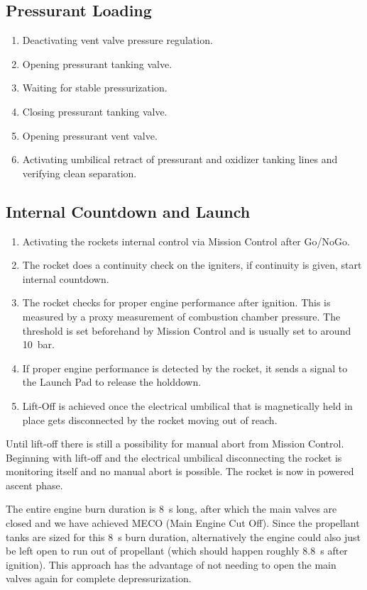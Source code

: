 \subsection{Pressurant Loading}
\label{sec:pressurant_loading}
\begin{enumerate}
\item Deactivating vent valve pressure regulation.
\item Opening pressurant tanking valve.
\item Waiting for stable pressurization.
\item Closing pressurant tanking valve.
\item Opening pressurant vent valve.
\item Activating umbilical retract of pressurant and oxidizer tanking lines and verifying clean separation.
\end{enumerate}

\subsection{Internal Countdown and Launch}
\begin{enumerate}
\item Activating the rockets internal control via Mission Control after Go/NoGo.
\item The rocket does a continuity check on the igniters, if continuity is given,  start internal countdown.
\item The rocket checks for proper engine performance after ignition. This is measured by a proxy measurement of combustion chamber pressure. The threshold is set beforehand by Mission Control and is usually set to around \SI{10}{\bar}.
\item If proper engine performance is detected by the rocket, it sends a signal to the Launch Pad to release the holddown.
\item Lift-Off is achieved once the electrical umbilical that is magnetically held in place gets disconnected by the rocket moving out of reach.
\end{enumerate}

Until lift-off there is still a possibility for manual abort from Mission Control. Beginning with lift-off and the electrical umbilical disconnecting the rocket is monitoring itself and no manual abort is possible. The rocket is now in powered ascent phase.

The entire engine burn duration is \SI{8}{\second} long, after which the main valves are closed and we have achieved MECO (Main Engine Cut Off). Since the propellant tanks are sized for this \SI{8}{\second} burn duration, alternatively the engine could also just be left open to run out of propellant (which should happen roughly \SI{8.8}{\second} after ignition). This approach has the advantage of not needing to open the main valves again for complete depressurization.

